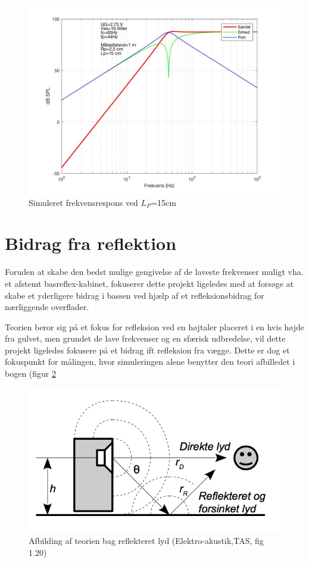 \begin{figure}[h!]
	\centering
	\includegraphics[width=.8\textwidth]{Pics/sim_lang}
	\caption{Simuleret frekvensrespons ved $L_P$=15cm } 
	\label{fig:sim_langt}
\end{figure}


\section{Bidrag fra reflektion}
\label{sec:reflection}
Foruden at skabe den bedst mulige gengivelse af de laveste frekvenser muligt vha. et afstemt basreflex-kabinet, fokuserer dette projekt ligeledes med at forsøge at skabe et yderligere bidrag i bassen ved hjælp af et refleksionsbidrag for nærliggende overflader. 

Teorien beror sig på et fokus for refleksion ved en højtaler placeret i en hvis højde fra gulvet, men grundet de lave frekvenser og en sfærisk udbredelse, vil dette projekt ligeledes fokusere på et bidrag ift refleksion fra vægge. 
Dette er dog et fokuspunkt for målingen, hvor simuleringen alene benytter den teori afbilledet i bogen (figur \ref{fig:reflect}


\begin{figure}[h!]
	\centering
	\includegraphics[width=.7\textwidth]{Pics/reflect}
	\caption{Afbilding af teorien bag reflekteret lyd (Elektro-akustik,TAS, fig 1.20) } 
	\label{fig:reflect}
\end{figure}

